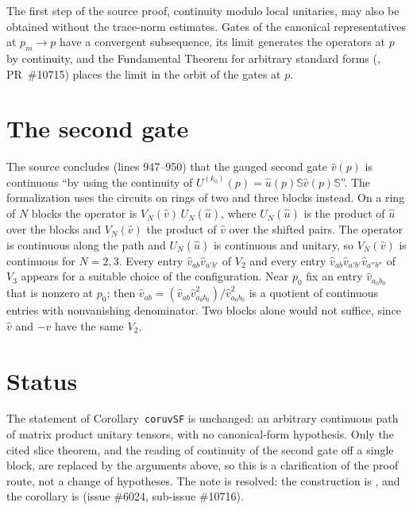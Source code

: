 \documentclass{article}
\begin{document}
The first step of the source proof, continuity modulo local unitaries, may also
be obtained without the trace-norm estimates. Gates of the canonical
representatives at $p_m\to p$ have a convergent subsequence, its limit
generates the operators at $p$ by continuity, and the Fundamental Theorem for
arbitrary standard forms (,
PR~\#10715) places the limit in the orbit of the gates at $p$.

\section{The second gate}

The source concludes (lines 947--950) that the gauged second gate $\hat v(p)$
is continuous ``by using the continuity of
$U^{(k_0)}(p)=\hat u(p)\mathbb S\hat v(p)\mathbb S$''. The formalization uses
the circuits on rings of two and three blocks instead. On a ring of $N$ blocks
the operator is $V_N(\hat v)\,U_N(\hat u)$, where $U_N(\hat u)$ is the product
of $\hat u$ over the blocks and $V_N(\hat v)$ the product of $\hat v$ over the
shifted pairs. The operator is continuous along the path and $U_N(\hat u)$ is
continuous and unitary, so $V_N(\hat v)$ is continuous for $N=2,3$. Every entry
$\hat v_{ab}\hat v_{a'b'}$ of $V_2$ and every entry $\hat v_{ab}\hat v_{a'b'}\hat
v_{a''b''}$ of $V_3$ appears for a suitable choice of the configuration. Near
$p_0$ fix an entry $\hat v_{a_0b_0}$ that is nonzero at $p_0$; then
$\hat v_{ab}=(\hat v_{ab}\hat v_{a_0b_0}^2)/\hat v_{a_0b_0}^2$ is a quotient of
continuous entries with nonvanishing denominator. Two blocks alone would not
suffice, since $\hat v$ and $-\hat v$ have the same $V_2$.

\section{Status}

The statement of Corollary~\texttt{coruvSF} is unchanged: an arbitrary
continuous path of matrix product unitary tensors, with no canonical-form
hypothesis. Only the cited slice theorem, and the reading of continuity of the
second gate off a single block, are replaced by the arguments above, so this is
a clarification of the proof route, not a change of hypotheses. The note is
resolved: the construction is
, and the
corollary is 
(issue \#6024, sub-issue \#10716).



\end{document}
